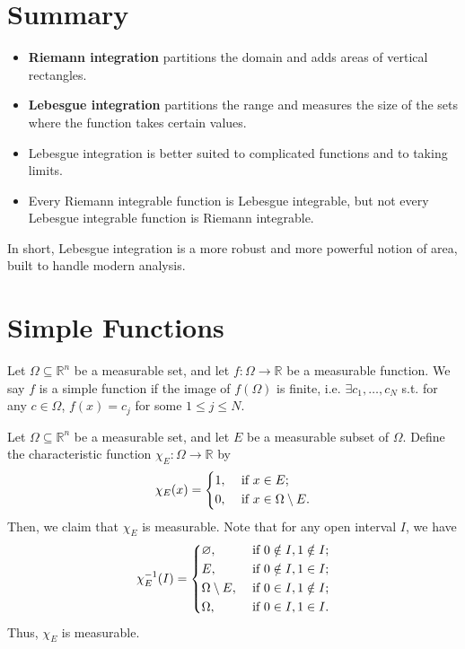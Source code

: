 \section*{Summary}

\begin{itemize}[leftmargin=1.5em]
    \item \textbf{Riemann integration} partitions the domain and adds areas of vertical rectangles.
    \item \textbf{Lebesgue integration} partitions the range and measures the size of the sets where the function takes certain values.
    \item Lebesgue integration is better suited to complicated functions and to taking limits.
    \item Every Riemann integrable function is Lebesgue integrable, but not every Lebesgue integrable function is Riemann integrable.
\end{itemize}

In short, Lebesgue integration is a more robust and more powerful notion of area, built to handle modern analysis.

\newpage
\section{Simple Functions}
\begin{definition}
    Let \(\Omega \subseteq \mathbb{R} ^n\) be a measurable set, and let \(f: \Omega \to \mathbb{R}\) be a measurable function. We say \(f\) is a simple function if the image of \(f(\Omega)\) is finite, i.e. \(\exists c_1, \dots , c_N\) s.t. for any \(c \in \Omega\), \(f(x) = c_j\) for some \(1 \le j \le N\).        
\end{definition}

\begin{eg}
    Let \(\Omega \subseteq \mathbb{R} ^n\) be a measurable set, and let \(E\) be a measurable subset of \(\Omega\). Define the characteristic function \(\chi _E: \Omega \to \mathbb{R}\) by 
    \[
        \chi _E (x) = \begin{dcases}
            1, &\text{ if } x \in E ;\\
            0, &\text{ if } x \in \Omega \setminus E.
        \end{dcases}
    \]    
    Then, we claim that \(\chi _E\) is measurable. Note that for any open interval \(I\), we have  
    \[
        \chi _E^{-1}(I) = \begin{dcases}
            \varnothing , &\text{ if } 0 \notin I, 1 \notin I ;\\
            E, &\text{ if } 0 \notin I, 1 \in I ;\\
            \Omega \setminus E, &\text{ if } 0 \in I, 1 \notin I ;\\
            \Omega , &\text{ if } 0 \in I, 1 \in I.
        \end{dcases}
    \] 
    Thus, \(\chi _E\) is measurable. 
\end{eg}

